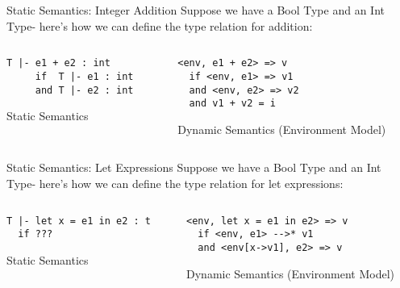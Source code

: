 \documentclass{beamer}
\begin{document}
    \begin{frame}[fragile]{Static Semantics: Integer Addition}
    Suppose we have a Bool Type and an Int Type- here's how we can define the type relation for addition:
    \begin{columns}
        \begin{column}{0.48\textwidth}
\begin{verbatim}
T |- e1 + e2 : int
     if  T |- e1 : int
     and T |- e2 : int
\end{verbatim}
    Static Semantics
        \end{column}
        \begin{column}{0.48\textwidth}
\begin{verbatim}
<env, e1 + e2> => v
  if <env, e1> => v1
  and <env, e2> => v2
  and v1 + v2 = i
\end{verbatim}
    Dynamic Semantics (Environment Model)
        \end{column}
    \end{columns}
    \end{frame}
    
    \begin{frame}[fragile]{Static Semantics: Let Expressions}
    Suppose we have a Bool Type and an Int Type- here's how we can define the type relation for let expressions:
    \begin{columns}
        \begin{column}{0.48\textwidth}
\begin{verbatim}
T |- let x = e1 in e2 : t
  if ???
\end{verbatim}
    Static Semantics
        \end{column}
        \begin{column}{0.48\textwidth}
\begin{verbatim}
<env, let x = e1 in e2> => v
  if <env, e1> -->* v1
  and <env[x->v1], e2> => v
\end{verbatim}
    Dynamic Semantics (Environment Model)
        \end{column}
    \end{columns}
    \end{frame}
    
\end{document}
